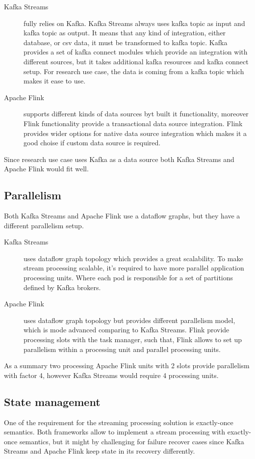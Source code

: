 \begin{description}
    \item[Kafka Streams] fully relies on Kafka.
    Kafka Streams always uses kafka topic as input and kafka topic as output.
    It means that any kind of integration, either database, or csv data, it must
    be transformed to kafka topic.
    Kafka provides a set of kafka connect modules which provide an integration with
    different sources, but it takes additional kafka resources and kafka connect setup.
    For research use case, the data is coming from a kafka topic which makes it ease to use.
    \item[Apache Flink] supports different kinds of data sources byt built it functionality,
    moreover Flink functionality provide a transactional data source integration.
    Flink provides wider options for native data source integration which makes it
    a good choise if custom data source is required.
\end{description}

Since research use case uses Kafka as a data source both
Kafka Streams and Apache Flink would fit well.


\subsection{Parallelism}\label{subsec:topology}
Both Kafka Streams and Apache Flink use a dataflow graphs, but they
have a different parallelism setup.

\begin{description}
    \item[Kafka Streams] uses dataflow graph topology which provides a great scalability.
    To make stream processing scalable, it's required to have more parallel application
    processing units.
    Where each pod is responsible for a set of partitions defined by Kafka brokers.
    \item[Apache Flink] uses dataflow graph topology but provides different
    parallelism model, which is mode advanced comparing to Kafka Streams.
    Flink provide processing slots with the task manager, such that, Flink
    allows to set up parallelism within a processing unit and parallel processing units.
\end{description}

As a summary two processing Apache Flink units with 2 slots provide parallelism with factor 4,
however Kafka Streams would require 4 processing units.

\subsection{State management}\label{subsec:state-management}
One of the requirement for the streaming processing solution is exactly-once semantics.
Both frameworks allow to implement a stream processing with exactly-once semantics,
but it might by challenging for failure recover cases since Kafka Streams and
Apache Flink keep state in its recovery differently.

